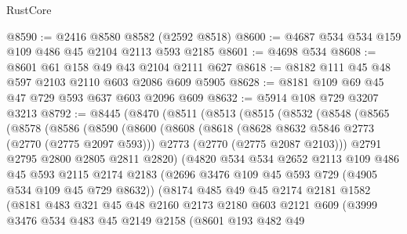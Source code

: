 \begin{lexlean}{RustCore}
\begin{coremodule}
@8590 := @2416 @8580 @8582 (@2592 @8518)
@8600 := @4687 @534 @534 @159 @109 @486 @45 @2104 @2113 @593 @2185
@8601 := @4698 @534
@8608 := @8601 @61 @158 @49 @43 @2104 @2111 @627
@8618 := @8182 @111 @45 @48 @597 @2103 @2110 @603 @2086 @609 @5905
@8628 := @8181 @109 @69 @45 @47 @729 @593 @637 @603 @2096 @609
@8632 := @5914 @108 @729 @3207 @3213
@8792 := @8445
    (@8470
      (@8511
        (@8513
          (@8515
            (@8532
              (@8548
                (@8565
                  (@8578
                    (@8586
                      (@8590
                        (@8600
                          (@8608
                            (@8618
                              (@8628 @8632 @5846 @2773 (@2770 (@2775 @2097 @593)))
                              @2773
                              (@2770 (@2775 @2087 @2103)))
                            @2791
                            @2795
                            @2800
                            @2805
                            @2811
                            @2820)
                          (@4820
                            @534
                            @534
                            @2652
                            @2113
                            @109
                            @486
                            @45
                            @593
                            @2115
                            @2174
                            @2183
                            (@2696 @3476 @109 @45 @593 @729 (@4905 @534 @109 @45 @729 @8632))
                            (@8174
                              @485
                              @49
                              @45
                              @2174
                              @2181
                              @1582
                              (@8181
                                @483
                                @321
                                @45
                                @48
                                @2160
                                @2173
                                @2180
                                @603
                                @2121
                                @609
                                (@3999
                                  @3476
                                  @534
                                  @483
                                  @45
                                  @2149
                                  @2158
                                  (@8601
                                    @193
                                    @482
                                    @49

\end{coremodule}
\end{lexlean}
